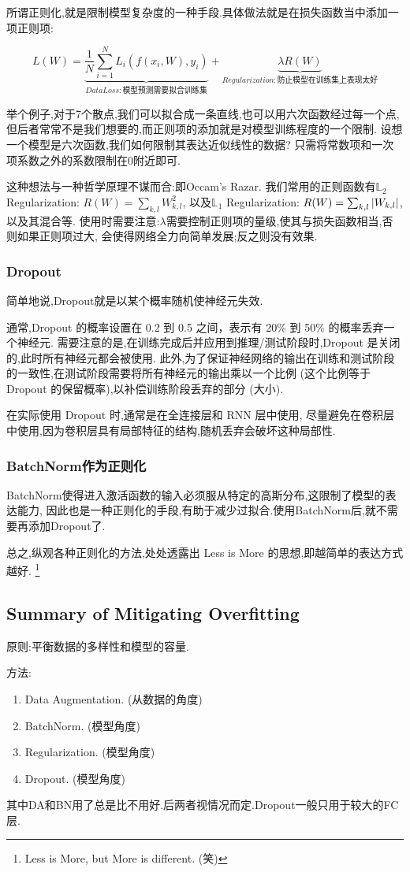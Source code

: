 所谓正则化,就是限制模型复杂度的一种手段.具体做法就是在损失函数当中添加一项正则项:

\begin{equation}
	L(W) = \underbrace{\frac{1}{N}\sum_{i=1}^{N} L_i(f(x_i, W), y_i) }_{Data Loss:\text{模型预测需要拟合训练集}} + \underbrace{\lambda R(W)}_{Regularization:\text{防止模型在训练集上}\textbf{表现太好}}
\end{equation}

举个例子,对于7个散点,我们可以拟合成一条直线,也可以用六次函数经过每一个点,
但后者常常不是我们想要的,而正则项的添加就是对模型训练程度的一个限制.
设想一个模型是六次函数,我们如何限制其表达近似线性的数据?
只需将常数项和一次项系数之外的系数限制在0附近即可.

这种想法与一种哲学原理不谋而合:即Occam's Razar.
我们常用的正则函数有$\mathbb L_2$ Regularization: $R(W) = \sum_{k,l}W_{k, l}^2$,
以及$\mathbb L_1$ Regularization: $R(W) = \sum_{k,l}\left|W_{k, l} \right|$,以及其混合等.
使用时需要注意:$\lambda$需要控制正则项的量级,使其与损失函数相当,否则如果正则项过大,
会使得网络全力向简单发展;反之则没有效果.

\subsubsection{Dropout}
简单地说,Dropout就是以某个概率随机使神经元失效.

通常,Dropout 的概率设置在 0.2 到 0.5 之间，表示有 20\% 到 50\% 的概率丢弃一个神经元.
需要注意的是,在训练完成后并应用到推理/测试阶段时,Dropout 是关闭的,此时所有神经元都会被使用.
此外,为了保证神经网络的输出在训练和测试阶段的一致性,在测试阶段需要将所有神经元的输出乘以一个比例
(这个比例等于 Dropout 的保留概率),以补偿训练阶段丢弃的部分 (大小).

在实际使用 Dropout 时,通常是在全连接层和 RNN 层中使用,
尽量避免在卷积层中使用,因为卷积层具有局部特征的结构,随机丢弃会破坏这种局部性.

\subsubsection{BatchNorm作为正则化}

BatchNorm使得进入激活函数的输入必须服从特定的高斯分布,这限制了模型的表达能力,
因此也是一种正则化的手段,有助于减少过拟合.使用BatchNorm后,就不需要再添加Dropout了.

总之,纵观各种正则化的方法,处处透露出 Less is More 的思想,即越简单的表达方式越好.
\footnote{Less is More, but More is different. (笑)}

\subsection{Summary of Mitigating Overfitting}
原则:平衡数据的多样性和模型的容量.

方法:
\begin{enumerate}
	\item Data Augmentation. (从数据的角度)
	\item BatchNorm. (模型角度)
	\item Regularization. (模型角度)
	\item Dropout. (模型角度)
\end{enumerate}

其中DA和BN用了总是比不用好.后两者视情况而定.Dropout一般只用于较大的FC层.